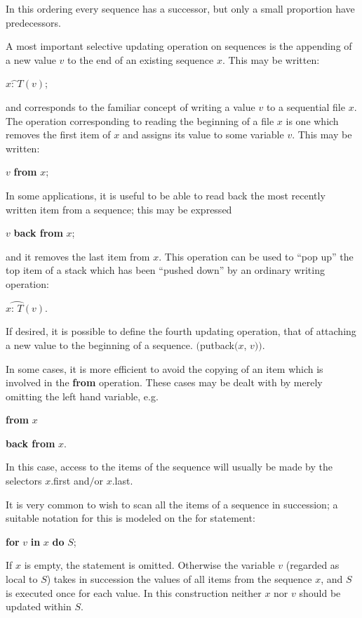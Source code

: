 \documentclass[twoside,11pt]{book}
\let\wideparen\overparen
\begin{document}
\noindent
In this ordering every sequence has a successor, but only a small proportion have predecessors.

A most important selective updating operation on sequences is the appending of a new value $v$ to the end of an existing sequence $x$. This may be written:


\quad $x\wideparen{\text{: \ } }T(v)$;

\noindent
and corresponds to the familiar concept of writing a value $v$ to a sequential file $x$. The operation corresponding to reading the beginning of a file $x$ is one which removes the first item of $x$ and assigns its value to some variable $v$. This may be written:

\quad $v$ \textbf{from} $x$;

\noindent
In some applications, it is useful to be able to read back the most recently written item from a sequence; this may be expressed

\quad $v$ \textbf{back from} $x$;

\noindent
and it removes the last item from $x$. This operation can be used to ``pop up'' the top item of a stack which has been ``pushed down'' by an ordinary writing operation:

\quad $x\wideparen{\text{: } T}(v).$

\noindent
If desired, it is possible to define the fourth updating operation, that of attaching a new value to the beginning of a sequence. $($putback$(x$, $v))$.

In some cases, it is more efficient to avoid the copying of an item which is involved in the \textbf{from} operation. These cases may be dealt with by merely omitting the left hand variable, e.g.

\quad \textbf{from} $x$

\quad \textbf{back from} $x$.

\noindent
In this case, access to the items of the sequence will usually be made by the selectors $x$.first and$/$or $x$.last.

It is very common to wish to scan all the items of a sequence in succession; a suitable notation for this is modeled on the for statement:

\quad \textbf{for} $v$ \textbf{in} $x$ \textbf{do} $S$;

\noindent
If $x$ is empty, the statement is omitted. Otherwise the variable $v$ (regarded as local to $S$) takes in succession the values of all items from the sequence $x$, and $S$ is executed once for each value. In this construction neither $x$ nor $v$ should be updated within $S$.
\end{document}
